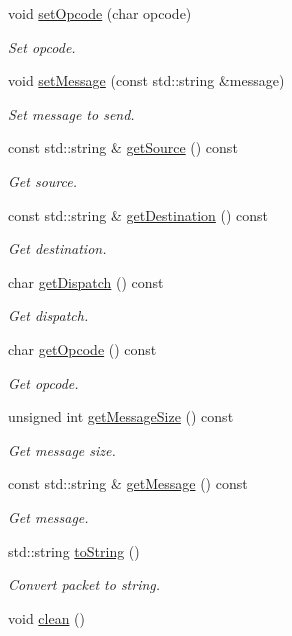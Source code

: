 \begin{DoxyCompactItemize}
void \hyperlink{class_packet_ac909fb062666c06b70c45c08be7facde}{set\-Opcode} (char opcode)
\begin{DoxyCompactList}\small\item\em Set opcode. \end{DoxyCompactList}\item 
void \hyperlink{class_packet_a054264b62da2d34df07733ac139aa44c}{set\-Message} (const std\-::string \&message)
\begin{DoxyCompactList}\small\item\em Set message to send. \end{DoxyCompactList}\item 
const std\-::string \& \hyperlink{class_packet_a51d506acce24c2b8ac926a85e9732418}{get\-Source} () const 
\begin{DoxyCompactList}\small\item\em Get source. \end{DoxyCompactList}\item 
const std\-::string \& \hyperlink{class_packet_ab1d5e174f9ebaa20b10ed9f2e8ca8606}{get\-Destination} () const 
\begin{DoxyCompactList}\small\item\em Get destination. \end{DoxyCompactList}\item 
char \hyperlink{class_packet_aace6f931cc1f52fd31832cc52abec585}{get\-Dispatch} () const 
\begin{DoxyCompactList}\small\item\em Get dispatch. \end{DoxyCompactList}\item 
char \hyperlink{class_packet_aaa20097d85d4ade8de178b4ceccd5a00}{get\-Opcode} () const 
\begin{DoxyCompactList}\small\item\em Get opcode. \end{DoxyCompactList}\item 
unsigned int \hyperlink{class_packet_a653d04484a4f8906704ac8e03c8619fc}{get\-Message\-Size} () const 
\begin{DoxyCompactList}\small\item\em Get message size. \end{DoxyCompactList}\item 
const std\-::string \& \hyperlink{class_packet_a54897d861a74bd7244c678fc90cc9956}{get\-Message} () const 
\begin{DoxyCompactList}\small\item\em Get message. \end{DoxyCompactList}\item 
std\-::string \hyperlink{class_packet_aa4f4ad4075cad5a29af1646c3e289399}{to\-String} ()
\begin{DoxyCompactList}\small\item\em Convert packet to string. \end{DoxyCompactList}\item 
\hypertarget{class_packet_ad43ea0f5524ffa2d2d9a2a8b028840f2}{void \hyperlink{class_packet_ad43ea0f5524ffa2d2d9a2a8b028840f2}{clean} ()}\label{class_packet_ad43ea0f5524ffa2d2d9a2a8b028840f2}


\end{DoxyCompactItemize}
